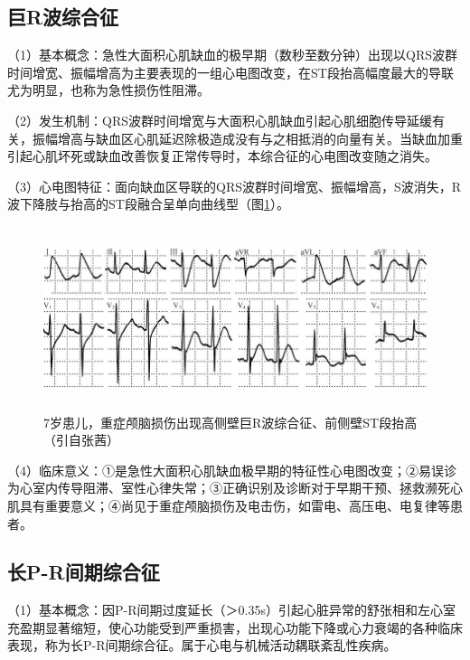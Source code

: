 \protect\hypertarget{text00047.htmlux5cux23subid568}{}{}

\subsection{巨R波综合征}

（1）基本概念：急性大面积心肌缺血的极早期（数秒至数分钟）出现以QRS波群时间增宽、振幅增高为主要表现的一组心电图改变，在ST段抬高幅度最大的导联尤为明显，也称为急性损伤性阻滞。

（2）发生机制：QRS波群时间增宽与大面积心肌缺血引起心肌细胞传导延缓有关，振幅增高与缺血区心肌延迟除极造成没有与之相抵消的向量有关。当缺血加重引起心肌坏死或缺血改善恢复正常传导时，本综合征的心电图改变随之消失。

（3）心电图特征：面向缺血区导联的QRS波群时间增宽、振幅增高，S波消失，R波下降肢与抬高的ST段融合呈单向曲线型（图\ref{fig40-15}）。

\begin{figure}[!htbp]
 \centering
 \includegraphics[width=5.78125in,height=2.11458in]{./images/Image00677.jpg}
 \captionsetup{justification=centering}
 \caption{7岁患儿，重症颅脑损伤出现高侧壁巨R波综合征、前侧壁ST段抬高（引自张茜）}
 \label{fig40-15}
  \end{figure} 

（4）临床意义：①是急性大面积心肌缺血极早期的特征性心电图改变；②易误诊为心室内传导阻滞、室性心律失常；③正确识别及诊断对于早期干预、拯救濒死心肌具有重要意义；④尚见于重症颅脑损伤及电击伤，如雷电、高压电、电复律等患者。

\protect\hypertarget{text00047.htmlux5cux23subid569}{}{}

\subsection{长P-R间期综合征}

（1）基本概念：因P-R间期过度延长（＞0.35s）引起心脏异常的舒张相和左心室充盈期显著缩短，使心功能受到严重损害，出现心功能下降或心力衰竭的各种临床表现，称为长P-R间期综合征。属于心电与机械活动耦联紊乱性疾病。

